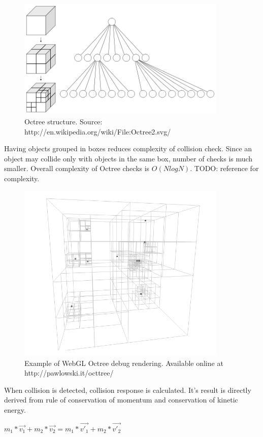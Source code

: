 \begin{figure}[h!]
  \caption{Octree structure. Source: http://en.wikipedia.org/wiki/File:Octree2.svg/}
  \label{img:octree2}
  \centering
	\includegraphics[width=10cm]{octree/octree2.png}
\end{figure} 

Having objects grouped in boxes reduces complexity of collision check. Since an object may collide only with objects in the same box, number of checks is much smaller. Overall complexity of Octree checks is $O(N log{N})$.
TODO: reference for complexity.

\begin{figure}[h!]
  \caption{Example of WebGL Octree debug rendering. Available online at http://pawlowski.it/octtree/}
  \label{img:octree}
  \centering
	\includegraphics[width=10cm]{octree/octree.png}
\end{figure} 

When collision is detected, collision response is calculated. It's result is directly derived from rule of conservation of momentum and conservation of kinetic energy.

$m_1*\vec{v_1} + m_2*\vec{v_2} = m_1*\vec{v'_1} + m_2*\vec{v'_2}$

